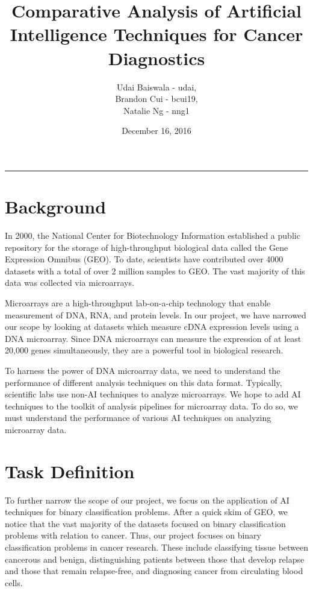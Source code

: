 \documentclass[12pt]{scrartcl}
\title{Comparative Analysis of Artificial Intelligence Techniques for Cancer Diagnostics}
\author{Udai Baiswala - udai, \\ 
Brandon Cui - bcui19, \\ 
Natalie Ng - nng1}
\date{December 16, 2016}
\begin{document}
  \maketitle

  \vspace{-0.3in}
  \rule{\linewidth}{0.4pt}
  
    \section{Background}
    In 2000, the National Center for Biotechnology Information established a public repository for the storage of high-throughput biological data called the Gene Expression Omnibus (GEO). To date, scientists have contributed over 4000 datasets with a total of over 2 million samples to GEO. The vast majority of this data was collected via microarrays.
    
    Microarrays are a high-throughput lab-on-a-chip technology that enable measurement of DNA, RNA, and protein levels. In our project, we have narrowed our scope by looking  at datasets which measure cDNA expression levels using a DNA microarray. Since DNA microarrays can measure the expression of at least 20,000 genes simultaneously, they are a powerful tool in biological research. 
    
    To harness the power of DNA microarray data, we need to understand the performance of different analysis techniques on this data format. Typically, scientific labs use non-AI techniques to analyze microarrays. We hope to add AI techniques to the toolkit of analysis pipelines for microarray data. To do so, we must understand the performance of various AI techniques on analyzing microarray data.
    \section{Task Definition}    
    To further narrow the scope of our project, we focus on the application of AI techniques for binary classification problems. After a quick skim of GEO, we notice that the vast majority of the datasets focused on binary classification problems with relation to cancer. Thus, our project focuses on binary classification problems in cancer research. These include classifying tissue between cancerous and benign, distinguishing patients between those that develop relapse and those that remain relapse-free, and diagnosing cancer from circulating blood cells. 
\end{document}
